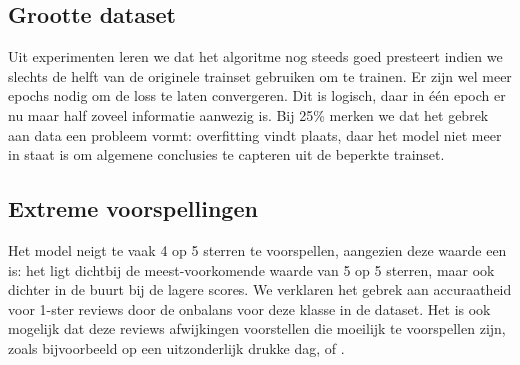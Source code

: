 \subsection{Grootte dataset}
Uit experimenten leren we dat het algoritme nog steeds goed presteert indien we slechts de helft van de originele trainset gebruiken om te trainen. Er zijn wel meer epochs nodig om de loss te laten convergeren. Dit is logisch, daar in één epoch er nu maar half zoveel informatie aanwezig is. Bij 25\% merken we dat het gebrek aan data een probleem vormt: overfitting vindt plaats, daar het model niet meer in staat is om algemene conclusies te capteren uit de beperkte trainset.


\subsection{Extreme voorspellingen}
Het model neigt te vaak 4 op 5 sterren te voorspellen, aangezien deze waarde een  is: het ligt dichtbij de meest-voorkomende waarde van 5 op 5 sterren, maar ook dichter in de buurt bij de lagere scores. We verklaren het gebrek aan accuraatheid voor 1-ster reviews door de onbalans voor deze klasse in de dataset. Het is ook mogelijk dat deze reviews afwijkingen voorstellen die moeilijk te voorspellen zijn, zoals bijvoorbeeld  op een uitzonderlijk drukke dag, of .

